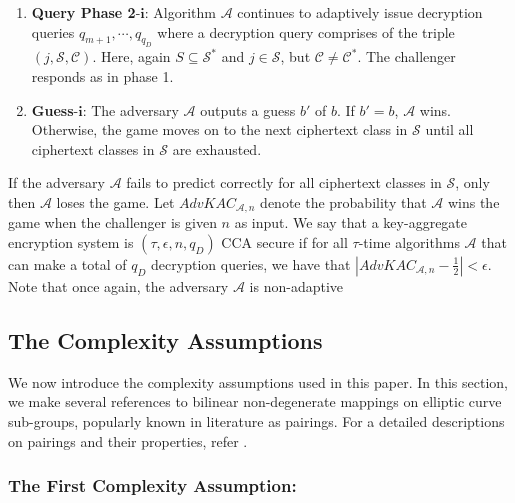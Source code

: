 \begin{enumerate}
 \item \textbf{Query Phase 2}-$\mathbf{i}$: Algorithm $\mathcal{A}$ continues to adaptively issue decryption queries $q_{m+1},\cdots,q_{q_D}$ where a decryption query comprises of the triple $(j,\mathcal{S},\mathcal{C})$. Here, again $S\subseteq{\mathcal{S}}^{*}$ and $j\in\mathcal{S}$, but $\mathcal{C}\neq {\mathcal{C}}^{*}$. The challenger responds as in phase 1. 
 
 \item\textbf{Guess}-$\mathbf{i}$: The adversary $\mathcal{A}$ outputs a guess $b'$ of $b$. If $b' = b$, $\mathcal{A}$ wins. Otherwise, the game moves on to the next ciphertext class in $\mathcal{S}$ until all ciphertext classes in $\mathcal{S}$ are exhausted.
\end{enumerate}
If the adversary $\mathcal{A}$ fails to predict correctly for all ciphertext classes in $\mathcal{S}$, only then $\mathcal{A}$ loses the game. Let $AdvKAC_{\mathcal{A},n}$ denote the probability that $\mathcal{A}$ wins the game when the challenger is given $n$ as input. We say that a key-aggregate encryption system is $(\tau,\epsilon,n,q_D)$ CCA secure if for all $\tau$-time algorithms $\mathcal{A}$ that can make a total of $q_D$ decryption queries, we have that $|AdvKAC_{\mathcal{A},n}-\frac{1}{2}| < \epsilon$. Note that once again, the adversary $\mathcal{A}$ is non-adaptive

\subsection{The Complexity Assumptions}

We now introduce the complexity assumptions used in this paper. In this section, we make several references to bilinear non-degenerate mappings on elliptic curve sub-groups, popularly known in literature as pairings. For a detailed descriptions on pairings and their properties, refer \cite{silverman1994advanced}.

\subsubsection{The First Complexity Assumption:}
\label{subsubsec:asm_1}

